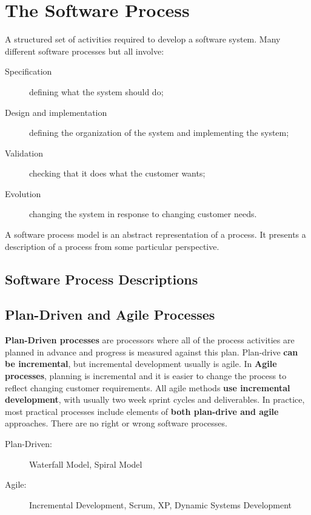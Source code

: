 \documentclass{report}
\begin{document}
\section{The Software Process}
A structured set of activities required to develop a software system.\newline
Many different software processes but all involve:
\begin{description}
  \item [Specification] defining what the system should do;
  \item [Design and implementation] defining the organization of the
system and implementing the system;
  \item [Validation] checking that it does what the customer wants;
  \item [Evolution] changing the system in response to changing
customer needs.
\end{description}
A software process model is an abstract representation of a process. It presents a description of a process from some particular perspective.

\subsection{Software Process Descriptions}

\subsection{Plan-Driven and Agile Processes}
\textbf{Plan-Driven processes} are processors where all of the process activities are planned in advance and progress is measured against this plan. Plan-drive \textbf{can be incremental}, but incremental development usually is agile. In \textbf{Agile processes}, planning is incremental and it is easier to change the process to reflect changing customer requirements. All agile methods \textbf{use incremental development}, with usually two week sprint cycles and deliverables. In practice, most practical processes include elements of \textbf{both plan-drive and agile} approaches. There are no right or wrong software processes.
\begin{description}
  \item [Plan-Driven:] Waterfall Model, Spiral Model
  \item [Agile:] Incremental Development, Scrum, XP, Dynamic Systems Development
\end{description}
\end{document}
